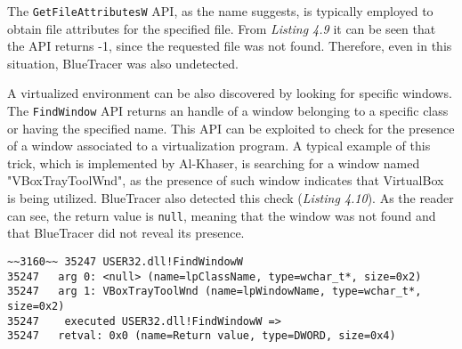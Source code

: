 The \texttt{GetFileAttributesW} API, as the name suggests, is typically employed to obtain file attributes for the specified file. From \textit{Listing 4.9} it can be seen that the API returns -1, since the requested file was not found. Therefore, even in this situation, BlueTracer was also undetected.

\iffalse
-Registry Artifacts
-File system artifacts -> Virtual Devices here?
-Window
-DLLs
\fi

A virtualized environment can be also discovered by looking for specific windows. The \texttt{FindWindow} API returns an handle of a window belonging to a specific class or having the specified name. This API can be exploited to check for the presence of a window associated to a virtualization program. A typical example of this trick, which is implemented by Al-Khaser, is searching for a window named "VBoxTrayToolWnd", as the presence of such window indicates that VirtualBox is being utilized. BlueTracer also detected this check (\textit{Listing 4.10}). As the reader can see, the return value is \texttt{null}, meaning that the window was not found and that BlueTracer did not reveal its presence.

\vspace{0.5cm}
\begin{lstlisting}[caption={ Log entry relative to \texttt{FindWindowW}},captionpos=b]
~~3160~~ 35247 USER32.dll!FindWindowW
35247 	arg 0: <null> (name=lpClassName, type=wchar_t*, size=0x2)
35247 	arg 1: VBoxTrayToolWnd (name=lpWindowName, type=wchar_t*, size=0x2)
35247    executed USER32.dll!FindWindowW =>
35247 	retval: 0x0 (name=Return value, type=DWORD, size=0x4)
\end{lstlisting}
   

